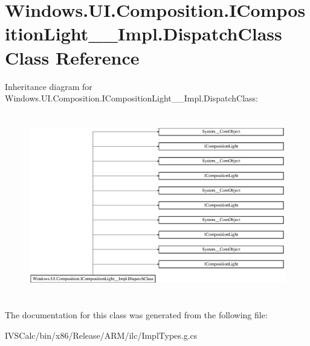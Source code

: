 \hypertarget{class_windows_1_1_u_i_1_1_composition_1_1_i_composition_light_____impl_1_1_dispatch_class}{}\section{Windows.\+U\+I.\+Composition.\+I\+Composition\+Light\+\_\+\+\_\+\+Impl.\+Dispatch\+Class Class Reference}
\label{class_windows_1_1_u_i_1_1_composition_1_1_i_composition_light_____impl_1_1_dispatch_class}
Inheritance diagram for Windows.\+U\+I.\+Composition.\+I\+Composition\+Light\+\_\+\+\_\+\+Impl.\+Dispatch\+Class\+:\begin{figure}[H]
\begin{center}
\leavevmode
\includegraphics[height=8.126648cm]{class_windows_1_1_u_i_1_1_composition_1_1_i_composition_light_____impl_1_1_dispatch_class}
\end{center}
\end{figure}


The documentation for this class was generated from the following file\+:\begin{DoxyCompactItemize}
\item 
I\+V\+S\+Calc/bin/x86/\+Release/\+A\+R\+M/ilc/Impl\+Types.\+g.\+cs\end{DoxyCompactItemize}
